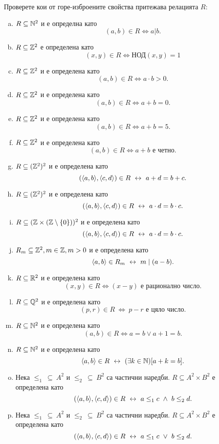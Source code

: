 \begin{problem}
  Проверете кои от горе-изброените свойства притежава релацията $R$:
  \begin{enumerate}[a)]
  \item
    $R\subseteq \mathbb{N}^2$ и е определна като 
    \[(a,b) \in R \iff a | b.\]
  \item
    $R \subseteq \mathbb{Z}^2$ е определена като
    \[(x,y)\in R \iff \mbox{НОД}(x,y) = 1\]%
  \item
    $R\subseteq \mathbb{Z}^2$ и е определена като
    \[(a,b) \in R \iff a\cdot b > 0.\]
  \item
    $R\subseteq \mathbb{Z}^2$ и е определена като 
    \[(a,b) \in R \iff a+b = 0.\]
  \item
    $R\subseteq \mathbb{Z}^2$ и е определена като
    \[(a,b) \in R \iff a+b = 5.\]
  \item
    $R\subseteq \mathbb{Z}^2$ и е определена като 
    \[(a,b) \in R \iff a+b\mbox{ е четно}.\]
  \item
    $R\subseteq (\mathbb{Z}^2)^2$ и е определена като
    \[(\langle{a,b}\rangle, \langle{c,d}\rangle) \in R \ \leftrightarrow\  a+d = b+c.\]
  \item
    $R\subseteq (\mathbb{Z}^2)^2$ и е определена като
    \[(\langle{a,b}\rangle,\langle{c,d}\rangle) \in R \ \leftrightarrow\  a\cdot d = b\cdot c.\]
  \item
    $R\subseteq (\mathbb{Z}\times (\mathbb{Z}\setminus\{0\}))^2$ и е определена като
    \[(\langle{a,b}\rangle,\langle{c,d}\rangle) \in R \ \leftrightarrow\  a\cdot d = b\cdot c.\]
  \item
    $R_{m}\subseteq \mathbb{Z}^2, m\in \mathbb{Z}, m>0$ и е определена като
    \[\langle{a,b}\rangle \in R_m \ \leftrightarrow\  m\mid (a - b).\]
  \item
    $R\subseteq \mathbb{R}^2$ и е определена като 
    \[(x,y) \in R \iff (x-y)\mbox{ е рационално число}.\]
  \item
    $R \subseteq \mathbb{Q}^2$ и е определена като
    \[(p,r) \in R\ \iff\ p-r \mbox{ е цяло число}.\]
  \item
    $R \subseteq \mathbb{N}^2$ и е определена като
    \[(a,b) \in R \iff a = b \vee a+1 = b.\]
  \item
    $R \subseteq \mathbb{N}^2$ и е определена като
    \[\langle{a,b}\rangle\in R \ \leftrightarrow\  (\exists k\in\mathbb{N})[a+k = b].\]
  \item
    Нека $\leq_1\ \subseteq\ A^2$ и $\leq_2\ \subseteq\ B^2$ са частични наредби.
    $R \subseteq A^2\times B^2$ е определена като
    \[(\langle{a,b}\rangle, \langle{c,d}\rangle) \in R \ \leftrightarrow\  a\leq_{1}c\ \wedge\ b\leq_{2}d .\]
  \item
    Нека $\leq_1\ \subseteq\ A^2$ и $\leq_2\ \subseteq\ B^2$ са частични наредби.
    $R \subseteq A^2\times B^2$ е определена като
    \[(\langle{a,b}\rangle, \langle{c,d}\rangle) \in R \ \leftrightarrow\  a\leq_{1}c\ \vee\ b\leq_{2}d .\]

  \end{enumerate}
\end{problem}


